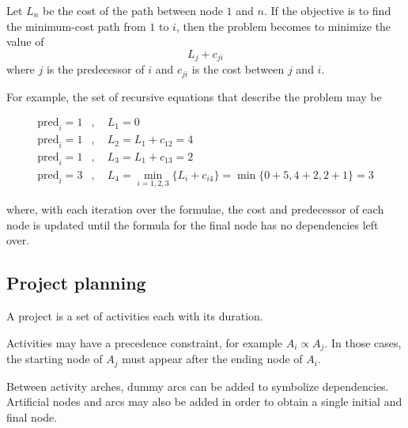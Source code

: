 Let $L_n$ be the cost of the path between node $1$ and $n$.
If the objective is to find the minimum-cost path from $1$ to $i$, then the problem becomes to minimize the value of $$L_{j} + c_{ji}$$ where $j$ is the predecessor of $i$ and $c_{ji}$ is the cost between $j$ and $i$.

For example, the set of recursive equations that describe the problem may be

\begin{align*}
    \textrm{pred}_i = 1 &, \quad L_1 = 0 \\
    \textrm{pred}_i = 1 &, \quad L_2 = L_1 + c_{12} = 4 \\
    \textrm{pred}_i = 1 &, \quad L_3 = L_1 + c_{13} = 2 \\
    \textrm{pred}_i = 3 &, \quad L_4 = \min_{i=1,2,3}\{L_i + c_{i4}\} = \min\{0+5, 4+2, 2+1\} = 3
\end{align*}

where, with each iteration over the formulae, the cost and predecessor of each node is updated until the formula for the final node has no dependencies left over.

\subsection{Project planning}

A project is a set of activities each with its duration.

Activities may have a precedence constraint, for example $A_i \propto A_j$.
In those cases, the starting node of $A_j$ must appear after the ending node of $A_i$.

Between activity arches, dummy arcs can be added to symbolize dependencies.
Artificial nodes and arcs may also be added in order to obtain a single initial and final node.

\begin{figure}[H]
    \centering
\end{figure}

